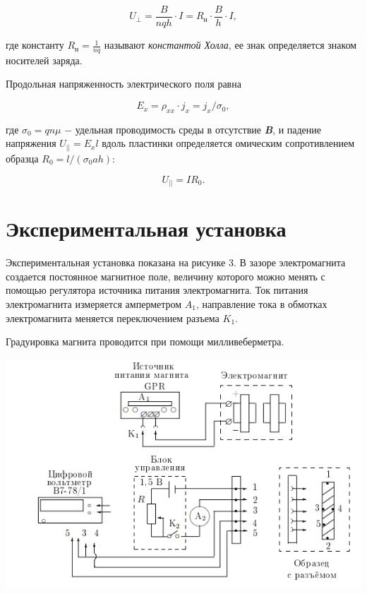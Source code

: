 \documentclass[a4paper,12pt]{article} %
\begin{document}
\begin{equation}\label{ linkname }
U_{\perp} = \frac{B}{nqh} \cdot I = R_\text{н} \cdot \frac{B}{h} \cdot I,
\end{equation}

\hfill \break где константу $R_\text{н} = \frac{1}{nq}$ называют \textit{константой Холла}, ее знак определяется знаком носителей заряда.

\hfill \break Продольная напряженность электрического поля равна 

$$
E_{x} = \rho_{xx} \cdot j_{x} = j_{x}/\sigma_{0},
$$

\hfill \break где $\sigma_{0} = qn\mu$ $-$ удельная проводимость среды в отсутствие \textit{\textbf{B}}, и падение напряжения $U_{||} = E_{x}l$ вдоль пластинки определяется омическим сопротивлением образца $R_{0} = l/(\sigma_{0}ah)$:

\begin{equation}\label{ linkname }
U_{||} = IR_{0}.
\end{equation}

\section{Экспериментальная установка}
\hfill \break Экспериментальная установка показана на рисунке 3. В зазоре электромагнита создается постоянное магнитное поле, величину которого можно менять с помощью регулятора источника питания электромагнита. Ток питания электромагнита измеряется амперметром $A_{1}$, направление тока в обмотках электромагнита меняется переключением разъема $K_{1}$.

\hfill \break Градуировка магнита проводится при помощи милливеберметра.

\begin{center}
\includegraphics[width=0.6\linewidth]{3.3.4_3.png}
\\
\end{center}
\end{document}
